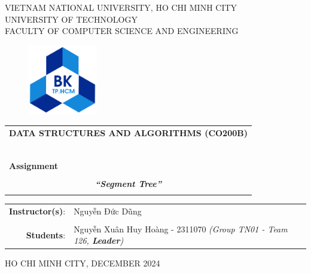 \documentclass[a4paper]{article}
\begin{document}
\begin{titlepage}
\begin{center}
VIETNAM NATIONAL UNIVERSITY, HO CHI MINH CITY \\
UNIVERSITY OF TECHNOLOGY \\
FACULTY OF COMPUTER SCIENCE AND ENGINEERING
\end{center}

\vspace{1cm}

\begin{figure}[h!]
\begin{center}
\includegraphics[width=3cm]{hcmut.png}
\end{center}
\end{figure}

\vspace{1cm}


\begin{center}
\begin{tabular}{c}
\multicolumn{1}{l}{\textbf{{\Large DATA STRUCTURES AND ALGORITHMS (CO200B)}}}\\
~~\\
\hline
\\
\multicolumn{1}{l}{\textbf{{\Large Assignment}}}\\
\\
\textbf{\textit{{\Huge “Segment Tree”}}}\\
\\
\hline
\end{tabular}
\end{center}

\vspace{2cm}

\begin{table}[h]
\centering
    \begin{tabular}{rl}
    \hspace{3 cm}\textbf{Instructor(s)}:
    & Nguyễn Đức Dũng\\

    & \\[10pt]
    \textbf{Students}: &  Nguyễn Xuân Huy Hoàng - 2311070 \emph{(Group TN01 - Team 126, \textbf{Leader})} \\
    \end{tabular}
\end{table}
\vspace{4cm}
\begin{center}
{\footnotesize HO CHI MINH CITY, DECEMBER 2024}
\end{center}
\end{titlepage}
\end{document}
